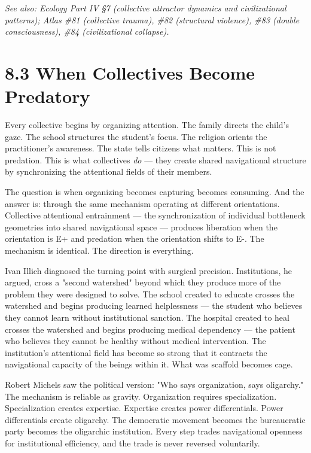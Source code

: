 \textit{See also: Ecology Part IV §7 (collective attractor dynamics and civilizational patterns); Atlas \#81 (collective trauma), \#82 (structural violence), \#83 (double consciousness), \#84 (civilizational collapse).}


\bigskip\noindent\makebox[\textwidth]{\color{rulegray}\rule{5cm}{0.3pt}}\bigskip


\section*{8.3 When Collectives Become Predatory}


Every collective begins by organizing attention. The family directs the child's gaze. The school structures the student's focus. The religion orients the practitioner's awareness. The state tells citizens what matters. This is not predation. This is what collectives \textit{do} — they create shared navigational structure by synchronizing the attentional fields of their members.


The question is when organizing becomes capturing becomes consuming. And the answer is: through the same mechanism operating at different orientations. Collective attentional entrainment — the synchronization of individual bottleneck geometries into shared navigational space — produces liberation when the orientation is E+ and predation when the orientation shifts to E-. The mechanism is identical. The direction is everything.


Ivan Illich diagnosed the turning point with surgical precision. Institutions, he argued, cross a "second watershed" beyond which they produce more of the problem they were designed to solve. The school created to educate crosses the watershed and begins producing learned helplessness — the student who believes they cannot learn without institutional sanction. The hospital created to heal crosses the watershed and begins producing medical dependency — the patient who believes they cannot be healthy without medical intervention. The institution's attentional field has become so strong that it contracts the navigational capacity of the beings within it. What was scaffold becomes cage.


Robert Michels saw the political version: "Who says organization, says oligarchy." The mechanism is reliable as gravity. Organization requires specialization. Specialization creates expertise. Expertise creates power differentials. Power differentials create oligarchy. The democratic movement becomes the bureaucratic party becomes the oligarchic institution. Every step trades navigational openness for institutional efficiency, and the trade is never reversed voluntarily.


